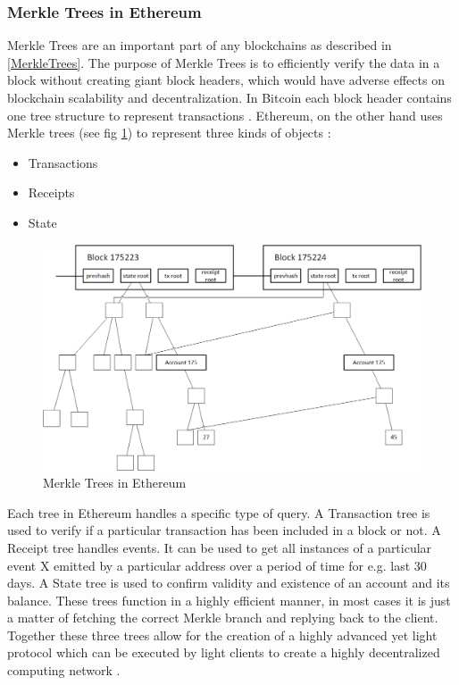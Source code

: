 \subsubsection{Merkle Trees in Ethereum}
Merkle Trees are an important part of any blockchains as described in \ref{MerkleTrees}.  The purpose of Merkle Trees is to efficiently verify the data in a block without creating giant block headers, which would have adverse effects on blockchain scalability and decentralization. In Bitcoin each block header contains one tree structure to represent transactions \cite{misc:025}. Ethereum, on the other hand uses Merkle trees (see fig \ref{fig:EthTree}) to represent three kinds of objects \cite{misc:025}:

\begin{itemize}
\item Transactions 
\item Receipts
\item State
\end{itemize}

\begin{figure}[h]
	\centering
    \includegraphics[width=130mm,scale=1]{figs/ethtree}
	\caption{Merkle Trees in Ethereum \cite{misc:025}}
	\label{fig:EthTree}
\end{figure}

Each tree in Ethereum handles a specific type of query. A Transaction tree is used to verify if a particular transaction has been included in a block or not.  A Receipt tree handles events. It can be used to get all instances of a particular event X emitted by a particular address over a period of time for e.g. last 30 days. A State tree is used to confirm validity and existence of an account and its balance. These trees function in a highly efficient manner, in most cases it is just a matter of fetching the correct Merkle branch and replying back to the client.  Together these three trees allow for the creation of a highly advanced yet light protocol which can be executed by light clients to create a highly decentralized computing network \cite{misc:025}. 
 
